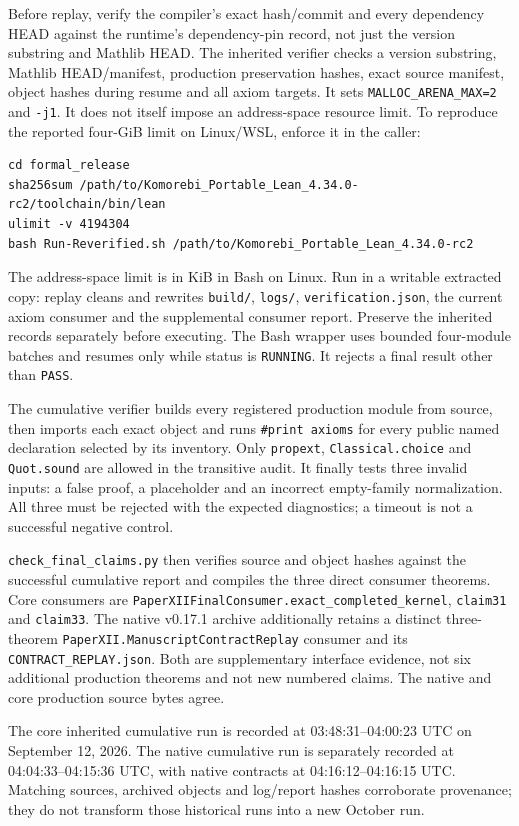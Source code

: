 \documentclass[11pt]{article}
\newcommand{\code}[1]{\nolinkurl{#1}}
\begin{document}
Before replay, verify the compiler's exact hash/commit and every dependency HEAD against the runtime's dependency-pin record, not just the version substring and Mathlib HEAD. The inherited verifier checks a version substring, Mathlib HEAD/manifest, production preservation hashes, exact source manifest, object hashes during resume and all axiom targets. It sets \code{MALLOC_ARENA_MAX=2} and \code{-j1}. It does not itself impose an address-space resource limit. To reproduce the reported four-GiB limit on Linux/WSL, enforce it in the caller:
\begin{Verbatim}[fontsize=\small,breaklines=true,breakanywhere=true,frame=lines]
cd formal_release
sha256sum /path/to/Komorebi_Portable_Lean_4.34.0-rc2/toolchain/bin/lean
ulimit -v 4194304
bash Run-Reverified.sh /path/to/Komorebi_Portable_Lean_4.34.0-rc2
\end{Verbatim}
The address-space limit is in KiB in Bash on Linux. Run in a writable extracted copy: replay cleans and rewrites \code{build/}, \code{logs/}, \code{verification.json}, the current axiom consumer and the supplemental consumer report. Preserve the inherited records separately before executing. The Bash wrapper uses bounded four-module batches and resumes only while status is \code{RUNNING}. It rejects a final result other than \code{PASS}.

The cumulative verifier builds every registered production module from source, then imports each exact object and runs \texttt{\#print axioms} for every public named declaration selected by its inventory. Only \code{propext}, \code{Classical.choice} and \code{Quot.sound} are allowed in the transitive audit. It finally tests three invalid inputs: a false proof, a placeholder and an incorrect empty-family normalization. All three must be rejected with the expected diagnostics; a timeout is not a successful negative control.

\code{check_final_claims.py} then verifies source and object hashes against the successful cumulative report and compiles the three direct consumer theorems. Core consumers are \code{PaperXIIFinalConsumer.exact_completed_kernel}, \code{claim31} and \code{claim33}. The native v0.17.1 archive additionally retains a distinct three-theorem \code{PaperXII.ManuscriptContractReplay} consumer and its \code{CONTRACT_REPLAY.json}. Both are supplementary interface evidence, not six additional production theorems and not new numbered claims. The native and core production source bytes agree.

The core inherited cumulative run is recorded at 03:48:31--04:00:23 UTC on September 12, 2026. The native cumulative run is separately recorded at 04:04:33--04:15:36 UTC, with native contracts at 04:16:12--04:16:15 UTC. Matching sources, archived objects and log/report hashes corroborate provenance; they do not transform those historical runs into a new October run.
\end{document}
